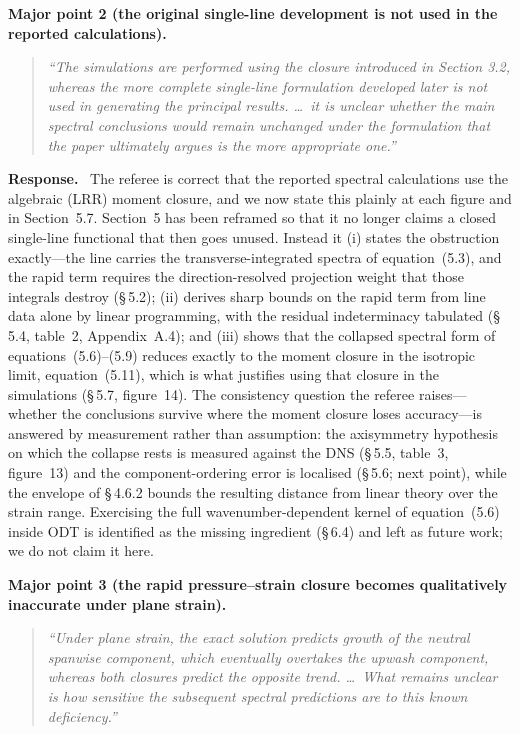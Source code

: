 \documentclass[11pt]{article}
\newenvironment{refcomment}%
  {\begin{quote}\color{commentgray}\itshape}%
  {\end{quote}}
\newcommand{\response}{\medskip\noindent\textbf{Response.}\ }
\newcommand{\point}[1]{\bigskip\noindent\textbf{#1}}
\begin{document}
\point{Major point 2 (the original single-line development is not used in
the reported calculations).}
\begin{refcomment}
``The simulations are performed using the closure introduced in Section
3.2, whereas the more complete single-line formulation developed later is
not used in generating the principal results. \ldots\ it is unclear whether
the main spectral conclusions would remain unchanged under the formulation
that the paper ultimately argues is the more appropriate one.''
\end{refcomment}

\response
The referee is correct that the reported spectral calculations use the
algebraic (LRR) moment closure, and we now state this plainly at each
figure and in Section~5.7. Section~5 has been reframed so that it no longer
claims a closed single-line functional that then goes unused. Instead it
(i) states the obstruction exactly---the line carries the
transverse-integrated spectra of equation~(5.3), and the rapid term
requires the direction-resolved projection weight that those integrals
destroy (\S\,5.2); (ii) derives sharp bounds on the rapid term from line
data alone by linear programming, with the residual indeterminacy tabulated
(\S\,5.4, table~2, Appendix~A.4); and (iii) shows that the collapsed
spectral form of equations~(5.6)--(5.9) reduces exactly to the moment
closure in the isotropic limit, equation~(5.11), which is what justifies
using that closure in the simulations (\S\,5.7, figure~14). The consistency
question the referee raises---whether the conclusions survive where the
moment closure loses accuracy---is answered by measurement rather than
assumption: the axisymmetry hypothesis on which the collapse rests is
measured against the DNS (\S\,5.5, table~3, figure~13) and the
component-ordering error is localised (\S\,5.6; next point), while the
envelope of \S\,4.6.2 bounds the resulting distance from linear theory over
the strain range. Exercising the full wavenumber-dependent kernel of
equation~(5.6) inside ODT is identified as the missing ingredient (\S\,6.4)
and left as future work; we do not claim it here.

\point{Major point 3 (the rapid pressure--strain closure becomes
qualitatively inaccurate under plane strain).}
\begin{refcomment}
``Under plane strain, the exact solution predicts growth of the neutral
spanwise component, which eventually overtakes the upwash component,
whereas both closures predict the opposite trend. \ldots\ What remains
unclear is how sensitive the subsequent spectral predictions are to this
known deficiency.''
\end{refcomment}
\end{document}
